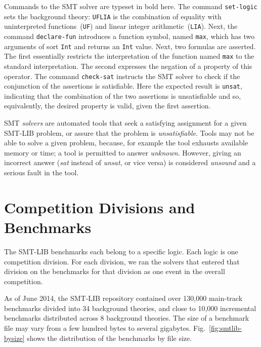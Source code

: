 \documentclass[twoside,11pt]{article}
\begin{document}
Commands to the SMT solver are typeset in bold here.  The command
\lstinline{set-logic} sets the background theory: \lstinline{UFLIA} is
the combination of equality with uninterpreted
functions~(\lstinline{UF}) and linear integer
arithmetic~(\lstinline{LIA}). Next, the command
\lstinline{declare-fun} introduces a function symbol, named
\lstinline{max}, which has two arguments of sort \lstinline{Int} and
returns an \lstinline{Int} value. Next, two formulas are asserted. The
first essentially restricts the interpretation of the function named
\lstinline{max} to the standard interpretation. The second expresses
the negation of a property of this operator. The command
\lstinline{check-sat} instructs the SMT solver to check if the
conjunction of the assertions is satisfiable. Here the expected result
is \lstinline{unsat}, indicating that the combination of the two
assertions is unsatisfiable and so, equivalently, the desired property
is valid, given the first assertion.

SMT \textit{solvers} are automated tools that seek a satisfying assignment for a given SMT-LIB problem, or assure that the problem is \emph{unsatisfiable}.
Tools may not be able to solve a given problem, because, for example the tool exhausts available memory or time; a tool is permitted to answer \emph{unknown}. However, giving an incorrect answer (\emph{sat} instead of \emph{unsat}, or vice versa) is considered \emph{unsound} and a serious fault in the tool.


\section{Competition Divisions and Benchmarks}
\label{sec:benchmarks}

The SMT-LIB benchmarks each belong to a specific logic. Each logic is one competition division. For each division, we ran the solvers that entered that division on the benchmarks for that division as one event in the overall competition.

As of June 2014, the SMT-LIB repository contained over 130,000
main-track benchmarks divided into 34 background theories, and
close to 10,000 incremental benchmarks distributed across 8 background
theories. The size of a benchmark file may vary from a few hundred
bytes to several gigabytes. Fig.~\ref{fig:smtlib-bysize} shows the
distribution of the benchmarks by file size.
\end{document}
